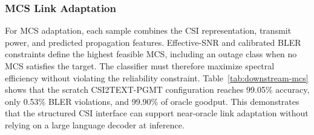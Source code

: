 \begin{table}[H]
\centering
\caption{Link-quality and outage prediction. Lower is better for power MAE; higher is better for
outage accuracy and F1. Underlining marks the best result. The final row compares the highlighted
model with the best of the three language-model baselines (red: improvement; blue: degradation).}
\label{tab:downstream-outage}
\scriptsize
\setlength{\tabcolsep}{2.6pt}
\end{table}

\subsubsection{MCS Link Adaptation}

For MCS adaptation, each sample combines the CSI representation, transmit power, and predicted
propagation features. Effective-SNR and calibrated BLER constraints define the highest feasible MCS,
including an outage class when no MCS satisfies the target. The classifier must therefore maximize
spectral efficiency without violating the reliability constraint. Table~\ref{tab:downstream-mcs}
shows that the scratch CSI2TEXT-PGMT configuration reaches 99.05\% accuracy, only 0.53\% BLER
violations, and 99.90\% of oracle goodput. This demonstrates that the structured CSI interface can
support near-oracle link adaptation without relying on a large language decoder at inference.

